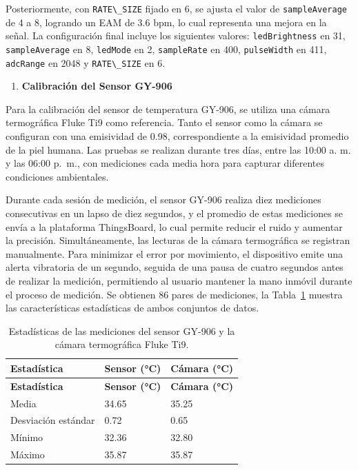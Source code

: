 \documentclass[
  12pt,
  letterpaper,
  DIV=11,
  numbers=noendperiod]{scrreport}
\providecommand{\tightlist}{%
  \setlength{\itemsep}{0pt}\setlength{\parskip}{0pt}}\usepackage{longtable,booktabs,array}
\begin{document}
Posteriormente, con \texttt{RATE\textbackslash{}\_SIZE} fijado en 6, se
ajusta el valor de \texttt{sampleAverage} de 4 a 8, logrando un EAM de
3.6 bpm, lo cual representa una mejora en la señal. La configuración
final incluye los siguientes valores: \texttt{ledBrightness} en 31,
\texttt{sampleAverage} en 8, \texttt{ledMode} en 2, \texttt{sampleRate}
en 400, \texttt{pulseWidth} en 411, \texttt{adcRange} en 2048 y
\texttt{RATE\textbackslash{}\_SIZE} en 6.

\begin{enumerate}
\def\labelenumi{\arabic{enumi}.}
\setcounter{enumi}{1}
\tightlist
\item
  \textbf{Calibración del Sensor GY-906}
\end{enumerate}

Para la calibración del sensor de temperatura GY-906, se utiliza una
cámara termográfica Fluke Ti9 como referencia. Tanto el sensor como la
cámara se configuran con una emisividad de 0.98, correspondiente a la
emisividad promedio de la piel humana. Las pruebas se realizan durante
tres días, entre las 10:00 a. m. y las 06:00 p.~m., con mediciones cada
media hora para capturar diferentes condiciones ambientales.

Durante cada sesión de medición, el sensor GY-906 realiza diez
mediciones consecutivas en un lapso de diez segundos, y el promedio de
estas mediciones se envía a la plataforma ThingsBoard, lo cual permite
reducir el ruido y aumentar la precisión. Simultáneamente, las lecturas
de la cámara termográfica se registran manualmente. Para minimizar el
error por movimiento, el dispositivo emite una alerta vibratoria de un
segundo, seguida de una pausa de cuatro segundos antes de realizar la
medición, permitiendo al usuario mantener la mano inmóvil durante el
proceso de medición. Se obtienen 86 pares de mediciones, la
Tabla~\ref{tbl-estadisticas-camara} muestra las características
estadísticas de ambos conjuntos de datos.

\hypertarget{tbl-estadisticas-camara}{}
\begin{longtable}[]{@{}lll@{}}
\caption{\label{tbl-estadisticas-camara}Estadísticas de las mediciones
del sensor GY-906 y la cámara termográfica Fluke Ti9.}\tabularnewline
\toprule\noalign{}
\textbf{Estadística} & \textbf{Sensor (°C)} & \textbf{Cámara (°C)} \\
\midrule\noalign{}
\endfirsthead
\toprule\noalign{}
\textbf{Estadística} & \textbf{Sensor (°C)} & \textbf{Cámara (°C)} \\
\midrule\noalign{}
\endhead
\bottomrule\noalign{}
\endlastfoot
Media & 34.65 & 35.25 \\
Desviación estándar & 0.72 & 0.65 \\
Mínimo & 32.36 & 32.80 \\
Máximo & 35.87 & 35.87 \\
\end{longtable}
\end{document}
